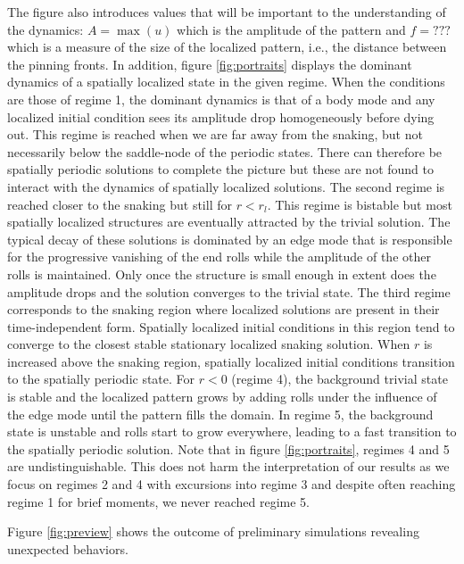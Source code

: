 \documentclass[../main/TimeForcingSHE.tex]{subfiles}
\begin{document}
\FIGportraits

The figure also introduces values that will be important to the understanding of the dynamics: $A = \max(u)$ which is the amplitude of the pattern and $f = ???$ which is a measure of the size of the localized pattern, i.e., the distance between the pinning fronts.
In addition, figure \ref{fig:portraits} displays the dominant dynamics of a spatially localized state in the given regime.
When the conditions are those of regime 1, the dominant dynamics is that of a body mode and any localized initial condition sees its amplitude drop homogeneously before dying out.
This regime is reached when we are far away from the snaking, but not necessarily below the saddle-node of the periodic states.
There can therefore be spatially periodic solutions to complete the picture but these are not found to interact with the dynamics of spatially localized solutions.
The second regime is reached closer to the snaking but still for $r<r_l$.
This regime is bistable but most spatially localized structures are eventually attracted by the trivial solution.
The typical decay of these solutions is dominated by an edge mode that is responsible for the progressive vanishing of the end rolls while the amplitude of the other rolls is maintained.
Only once the structure is small enough in extent does the amplitude drops and the solution converges to the trivial state.
The third regime corresponds to the snaking region where localized solutions are present in their time-independent form.
Spatially localized initial conditions in this region tend to converge to the closest stable stationary localized snaking solution.
When $r$ is increased above the snaking region, spatially localized initial conditions transition to the spatially periodic state.
For $r<0$ (regime 4), the background trivial state is stable and the localized pattern grows by adding rolls under the influence of the edge mode until the pattern fills the domain.
In regime 5, the background state is unstable and rolls start to grow everywhere, leading to a fast transition to the spatially periodic solution.
Note that in figure \ref{fig:portraits}, regimes 4 and 5 are undistinguishable.
This does not harm the interpretation of our results as we focus on regimes 2 and 4 with excursions into regime 3 and despite often reaching regime 1 for brief moments, we never reached regime 5.

Figure \ref{fig:preview} shows the outcome of preliminary simulations revealing unexpected behaviors.
\FIGpreview
\end{document}
